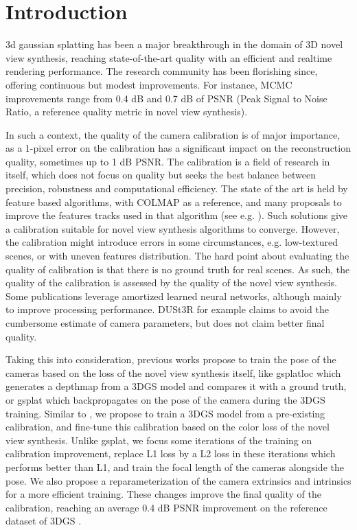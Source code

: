 \documentclass[a4paper,twoside,french]{article}
\begin{document}
\section{Introduction}
3d gaussian splatting \cite{kerbl20233d} has been a major breakthrough in the domain of 3D novel view synthesis, reaching state-of-the-art quality with an
efficient and realtime rendering performance. The research community has been florishing since, offering continuous but modest improvements.
For instance, MCMC \cite{kheradmand20243d} improvements range from 0.4 dB and 0.7 dB of PSNR (Peak Signal to Noise Ratio, a reference
quality metric in novel view synthesis).

In such a context, the quality of the camera calibration is of major importance, as a 1-pixel error on the calibration has a significant
impact on the reconstruction quality, sometimes up to 1 dB PSNR. The calibration is a field of research in itself, which does not focus on quality but seeks 
the best balance between precision, robustness and computational efficiency. The state of the art is held by feature based algorithms,
with COLMAP \cite{schonberger2018robust} as a reference, and many proposals to improve the features tracks used in that algorithm (see e.g. \cite{lindenberger2021pixel}).
Such solutions give a calibration suitable for novel view synthesis algorithms to converge. However, the calibration might introduce errors
in some circumstances, e.g. low-textured scenes, or with uneven features distribution. 
The hard point about evaluating the quality of calibration is that there is no ground truth for real scenes. As such, the quality of the calibration is assessed
by the quality of the novel view synthesis. Some publications leverage amortized learned neural networks, although
mainly to improve processing performance. DUSt3R \cite{wang2024dust3r} for example claims to avoid the cumbersome estimate of camera parameters,
but does not claim better final quality.

Taking this into consideration, previous works propose to train the pose of the cameras based on the loss of the novel view synthesis itself, like 
gsplatloc \cite{zeller2024gsplatloc} which generates a depthmap from a 3DGS model and compares it with a ground truth, or gsplat \cite{ye2024gsplat}
which backpropagates on the pose of the camera during the 3DGS training. Similar to \cite{ye2024gsplat}, we propose to train a 3DGS model from
a pre-existing calibration, and fine-tune this calibration based on the color loss of the novel view synthesis. Unlike gsplat,
we focus some iterations of the training on calibration improvement, replace L1 loss by a L2 loss in these iterations which performs better than L1,
and train the focal length of the cameras alongside the pose. We also propose a reparameterization of the camera extrinsics and intrinsics
for a more efficient training. These changes improve the final quality of the calibration, reaching an average 0.4 dB PSNR improvement
on the reference dataset of 3DGS \cite{kerbl20233d}.
\end{document}
